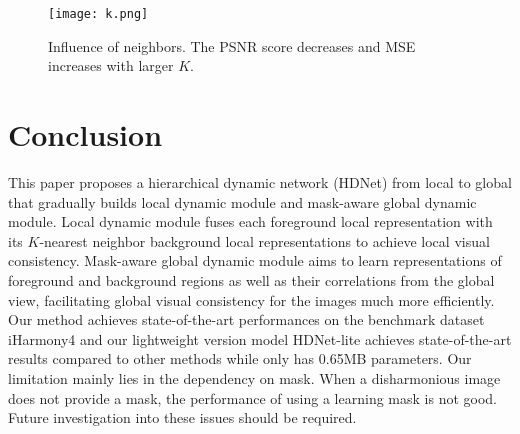 \documentclass[sigconf]{acmart}
\begin{document}
\begin{figure}[t]
	\centering
	\texttt{[image: k.png]}
	\caption{Influence of neighbors. The PSNR score decreases and MSE increases with larger $K$.}
	\label{k}
\end{figure}







\section{Conclusion}
This paper proposes a hierarchical dynamic network (HDNet) from local to global that gradually builds local dynamic module and mask-aware global dynamic module. Local dynamic module fuses each foreground local representation with its $K$-nearest neighbor background local representations to achieve local visual consistency. Mask-aware global dynamic module aims to learn representations of foreground and background regions as well as their correlations from the global view, facilitating global visual consistency for the images much more efficiently. Our method achieves state-of-the-art performances on the benchmark dataset iHarmony4 and our lightweight version model HDNet-lite achieves state-of-the-art results compared to other methods while only has 0.65MB parameters. Our limitation mainly lies in
the dependency on mask. When a disharmonious image does not provide a mask, the performance of using a learning mask is not good. Future investigation into these issues should be required.





\end{document}
